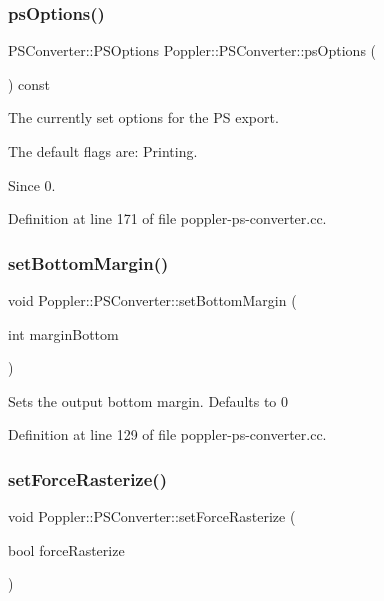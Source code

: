 \subsubsection{\texorpdfstring{ps\+Options()}{psOptions()}}
{\footnotesize\ttfamily P\+S\+Converter\+::\+P\+S\+Options Poppler\+::\+P\+S\+Converter\+::ps\+Options (\begin{DoxyParamCaption}{ }\end{DoxyParamCaption}) const}

The currently set options for the PS export.

The default flags are\+: Printing.

\begin{DoxySince}{Since}
0. 
\end{DoxySince}


Definition at line 171 of file poppler-\/ps-\/converter.\+cc.

\mbox{\label{class_poppler_1_1_p_s_converter_a45373befaea228d0a961f9327f0e27bf}} 
\subsubsection{\texorpdfstring{set\+Bottom\+Margin()}{setBottomMargin()}}
{\footnotesize\ttfamily void Poppler\+::\+P\+S\+Converter\+::set\+Bottom\+Margin (\begin{DoxyParamCaption}\item[{int}]{margin\+Bottom }\end{DoxyParamCaption})}

Sets the output bottom margin. Defaults to 0 

Definition at line 129 of file poppler-\/ps-\/converter.\+cc.

\mbox{\label{class_poppler_1_1_p_s_converter_aca8e393fa509c2cfe7302b8ddc5b1b62}} 
\subsubsection{\texorpdfstring{set\+Force\+Rasterize()}{setForceRasterize()}}
{\footnotesize\ttfamily void Poppler\+::\+P\+S\+Converter\+::set\+Force\+Rasterize (\begin{DoxyParamCaption}\item[{bool}]{force\+Rasterize }\end{DoxyParamCaption})}


